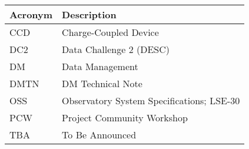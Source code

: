 \addtocounter{table}{-1}
\begin{longtable}{p{}p{}}\hline
\textbf{Acronym} & \textbf{Description}  \\\hline

CCD & Charge-Coupled Device \\\hline
DC2 & Data Challenge 2 (DESC) \\\hline
DM & Data Management \\\hline
DMTN & DM Technical Note \\\hline
OSS & Observatory System Specifications; LSE-30 \\\hline
PCW & Project Community Workshop \\\hline
TBA & To Be Announced \\\hline
\end{longtable}
